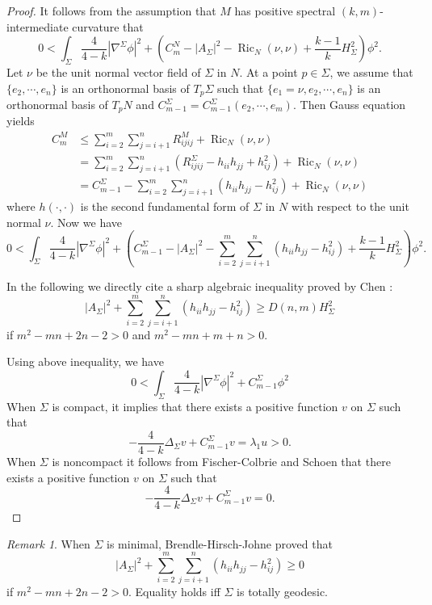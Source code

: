 \documentclass[11pt,letterpaper]{amsart}
\DeclareMathOperator{\Ric}{Ric}
\theoremstyle{definition}
\theoremstyle{remark}
\newtheorem{remark}[theorem]{Remark}
\numberwithin{equation}{section}
\begin{document}
\begin{proof}
    It follows from the assumption that $M$ has positive spectral $(k,m)$-intermediate curvature that 
    \begin{equation*}
        0<\int_\Sigma \frac{4}{4-k}|\nabla^\Sigma\phi|^2+(C_m^N-|A_\Sigma|^2-\Ric_N(\nu,\nu)+\frac{k-1}{k}H_{\Sigma}^2)\phi^2.
    \end{equation*}
    Let $\nu$ be the unit normal vector field of $\Sigma$ in $N$. At a point $p\in \Sigma$, we assume that $\{e_2,\cdots,e_n\}$ is an  orthonormal basis of $T_p\Sigma$ such that $\{e_1=\nu,e_2,\cdots,e_n\}$ is an orthonormal basis of $T_pN$ and $C_{m-1}^\Sigma=C_{m-1}^\Sigma(e_2,\cdots,e_m).$ Then Gauss equation yields
\begin{align*}
    C_m^M&\leq \sum_{i=2}^{m}\sum_{j=i+1}^n R^M_{ijij}+\Ric_N(\nu,\nu)\\
    &=\sum_{i=2}^{m}\sum_{j=i+1}^n (R^\Sigma_{ijij}-h_{ii}h_{jj}+h_{ij}^2)+\Ric_N(\nu,\nu)\\ &=C^\Sigma_{m-1}-\sum_{i=2}^{m}\sum_{j=i+1}^n (h_{ii}h_{jj}-h_{ij}^2)+\Ric_N(\nu,\nu)
\end{align*}    
where $h(\cdot,\cdot)$ is the second fundamental form of $\Sigma$ in $N$ with respect to the unit normal $\nu$. Now we have
\[0< \int_\Sigma \frac{4}{4-k}|\nabla^\Sigma\phi|^2+\left(C_{m-1}^\Sigma-|A_\Sigma|^2-\sum_{i=2}^{m}\sum_{j=i+1}^n (h_{ii}h_{jj}-h_{ij}^2)+\frac{k-1}{k}H_{\Sigma}^2\right)\phi^2.\]

In the following we directly cite a sharp algebraic inequality proved by Chen \cite[Lemma 5.8]{chenshuli_end}:
\[|A_\Sigma|^2+\sum_{i=2}^{m}\sum_{j=i+1}^n (h_{ii}h_{jj}-h_{ij}^2)\geq D(n,m)H_\Sigma^2\]
if $m^2-mn+2n-2>0$ and $m^2-mn+m+n>0$.


Using above inequality, we have
\[0<\int_\Sigma \frac{4}{4-k}|\nabla^\Sigma\phi|^2+C_{m-1}^\Sigma\phi^2\]
When $\Sigma$ is compact, it implies that there exists a positive function $v$ on $\Sigma$ such that
\[-\frac{4}{4-k}\Delta_\Sigma v+C^\Sigma_{m-1}v=\lambda_1 u> 0.\]
When $\Sigma$ is noncompact it follows from Fischer-Colbrie and Schoen \cite{Fischer-Colbrie-Schoen-The-structure-of-complete-stable} that there exists a positive function $v$ on $\Sigma$ such that 
\[-\frac{4}{4-k}\Delta_\Sigma v+C^\Sigma_{m-1}v=0.\]


\end{proof}

\begin{remark}\label{brendle's inequality}
    When $\Sigma$ is minimal, Brendle-Hirsch-Johne proved \cite{brendlegeroch'sconjecture} that
\[|A_\Sigma|^2+\sum_{i=2}^{m}\sum_{j=i+1}^n (h_{ii}h_{jj}-h_{ij}^2)\geq 0   \] 
if $m^2-mn+2n-2>0$. Equality holds iff $\Sigma$ is totally geodesic.
\end{remark}
\end{document}
